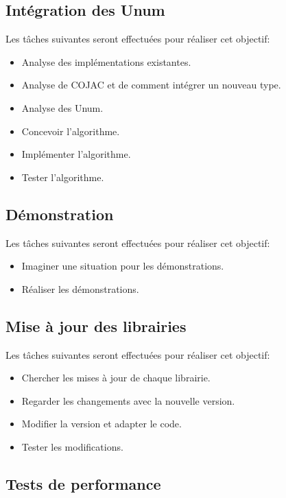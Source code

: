\subsection{Intégration des Unum}

Les tâches suivantes seront effectuées pour réaliser cet objectif:
\begin{itemize}
    \item Analyse des implémentations existantes.
    \item Analyse de COJAC et de comment intégrer un nouveau type.
    \item Analyse des Unum.
    \item Concevoir l'algorithme.
    \item Implémenter l'algorithme.
    \item Tester l'algorithme.
\end{itemize}

\subsection{Démonstration}

Les tâches suivantes seront effectuées pour réaliser cet objectif:
\begin{itemize}
    \item Imaginer une situation pour les démonstrations.
    \item Réaliser les démonstrations.
\end{itemize}

\subsection{Mise à jour des librairies}

Les tâches suivantes seront effectuées pour réaliser cet objectif:
\begin{itemize}
    \item Chercher les mises à jour de chaque librairie.
    \item Regarder les changements avec la nouvelle version.
    \item Modifier la version et adapter le code.
    \item Tester les modifications.
\end{itemize}

\subsection{Tests de performance}

